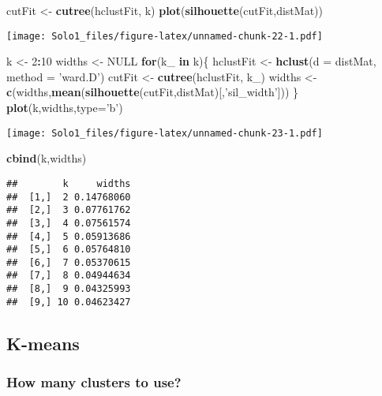 \documentclass[]{article}
\newenvironment{Shaded}{\begin{snugshade}}{\end{snugshade}}
\newcommand{\KeywordTok}[1]{\textcolor[rgb]{0.13,0.29,0.53}{\textbf{#1}}}
\newcommand{\DataTypeTok}[1]{\textcolor[rgb]{0.13,0.29,0.53}{#1}}
\newcommand{\DecValTok}[1]{\textcolor[rgb]{0.00,0.00,0.81}{#1}}
\newcommand{\StringTok}[1]{\textcolor[rgb]{0.31,0.60,0.02}{#1}}
\newcommand{\OtherTok}[1]{\textcolor[rgb]{0.56,0.35,0.01}{#1}}
\newcommand{\ControlFlowTok}[1]{\textcolor[rgb]{0.13,0.29,0.53}{\textbf{#1}}}
\newcommand{\OperatorTok}[1]{\textcolor[rgb]{0.81,0.36,0.00}{\textbf{#1}}}
\newcommand{\NormalTok}[1]{#1}
\begin{document}
\begin{Shaded}
\begin{Highlighting}[]
\NormalTok{cutFit <-}\StringTok{ }\KeywordTok{cutree}\NormalTok{(hclustFit, k)}
\KeywordTok{plot}\NormalTok{(}\KeywordTok{silhouette}\NormalTok{(cutFit,distMat))}
\end{Highlighting}
\end{Shaded}

\texttt{[image: Solo1\_files/figure-latex/unnamed-chunk-22-1.pdf]}

\begin{Shaded}
\begin{Highlighting}[]
\NormalTok{k <-}\StringTok{ }\DecValTok{2}\OperatorTok{:}\DecValTok{10}
\NormalTok{widths <-}\StringTok{ }\OtherTok{NULL}
\ControlFlowTok{for}\NormalTok{(k_ }\ControlFlowTok{in}\NormalTok{ k)\{}
\NormalTok{  hclustFit <-}\StringTok{ }\KeywordTok{hclust}\NormalTok{(}\DataTypeTok{d =}\NormalTok{ distMat, }\DataTypeTok{method =} \StringTok{'ward.D'}\NormalTok{)}
\NormalTok{  cutFit <-}\StringTok{ }\KeywordTok{cutree}\NormalTok{(hclustFit, k_)}
\NormalTok{  widths <-}\StringTok{ }\KeywordTok{c}\NormalTok{(widths,}\KeywordTok{mean}\NormalTok{(}\KeywordTok{silhouette}\NormalTok{(cutFit,distMat)[,}\StringTok{'sil_width'}\NormalTok{]))}
\NormalTok{\}}
\KeywordTok{plot}\NormalTok{(k,widths,}\DataTypeTok{type=}\StringTok{'b'}\NormalTok{)}
\end{Highlighting}
\end{Shaded}

\texttt{[image: Solo1\_files/figure-latex/unnamed-chunk-23-1.pdf]}

\begin{Shaded}
\begin{Highlighting}[]
\KeywordTok{cbind}\NormalTok{(k,widths)}
\end{Highlighting}
\end{Shaded}

\begin{verbatim}
##        k     widths
##  [1,]  2 0.14768060
##  [2,]  3 0.07761762
##  [3,]  4 0.07561574
##  [4,]  5 0.05913686
##  [5,]  6 0.05764810
##  [6,]  7 0.05370615
##  [7,]  8 0.04944634
##  [8,]  9 0.04325993
##  [9,] 10 0.04623427
\end{verbatim}

\subsection{K-means}\label{k-means}

\subsubsection{How many clusters to
use?}\label{how-many-clusters-to-use}
\end{document}
